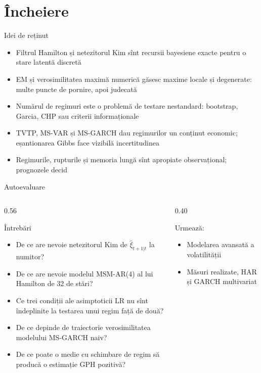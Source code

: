 \section{Încheiere}

\begin{frame}{Idei de reținut}
\itemsize{\small}
\begin{itemize}
    \item Filtrul Hamilton și netezitorul Kim sînt recursii bayesiene exacte pentru o stare latentă discretă
    \item EM și verosimilitatea maximă numerică găsesc maxime locale și degenerate: multe puncte de pornire, apoi judecată
    \item Numărul de regimuri este o problemă de testare nestandard: bootstrap, Garcia, CHP sau criterii informaționale
    \item TVTP, MS-VAR și MS-GARCH dau regimurilor un conținut economic; eșantionarea Gibbs face vizibilă incertitudinea
    \item Regimurile, rupturile și memoria lungă sînt apropiate observațional; prognozele decid
\end{itemize}
\end{frame}

\begin{frame}{Autoevaluare}
\itemsize{\small}
\begin{columns}[T]
\begin{column}{0.56\textwidth}
\begin{block}{Întrebări}
\begin{itemize}
    \item De ce are nevoie netezitorul Kim de $\hat\xi_{t+1|t}$ la numitor?
    \item De ce are nevoie modelul MSM-AR(4) al lui Hamilton de 32 de stări?
    \item Ce trei condiții ale asimptoticii LR nu sînt îndeplinite la testarea unui regim față de două?
    \item De ce depinde de traiectorie verosimilitatea modelului MS-GARCH naiv?
    \item De ce poate o medie cu schimbare de regim să producă o estimație GPH pozitivă?
\end{itemize}
\end{block}
\end{column}
\begin{column}{0.40\textwidth}
\begin{block}{Urmează: }
\begin{itemize}
    \item Modelarea avansată a volatilității
    \item Măsuri realizate, HAR și GARCH multivariat
\end{itemize}
\end{block}
\end{column}
\end{columns}
\end{frame}


